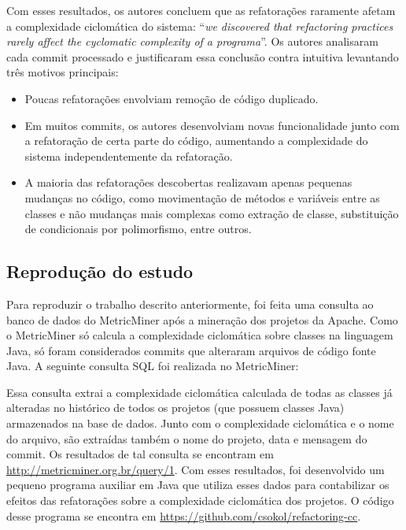 \documentclass[a4paper, 12pt, twoside]{book}
\begin{document}
        Com esses resultados, os autores concluem que as refatorações raramente afetam a complexidade ciclomática do sistema: ``\textit{we discovered that refactoring practices rarely affect the cyclomatic complexity of a programa}''. Os autores analisaram cada commit processado e justificaram essa conclusão contra intuitiva levantando três motivos principais:

        \begin{itemize}
            \item Poucas refatorações envolviam remoção de código duplicado.
            \item Em muitos commits, os autores desenvolviam novas funcionalidade junto com a refatoração de certa parte do código, aumentando a complexidade do sistema independentemente da refatoração.
            \item A maioria das refatorações descobertas realizavam apenas pequenas mudanças no código, como movimentação de métodos e variáveis entre as classes e não mudanças mais complexas como extração de classe, substituição de condicionais por polimorfismo, entre outros.
        \end{itemize}


        \subsection*{Reprodução do estudo}
        Para reproduzir o trabalho descrito anteriormente, foi feita uma consulta ao banco de dados do MetricMiner após a mineração dos projetos da Apache. Como o MetricMiner só calcula a complexidade ciclomática sobre classes na linguagem Java, só foram considerados commits que alteraram arquivos de código fonte Java. A seguinte consulta SQL foi realizada no MetricMiner:

        

        Essa consulta extrai a complexidade ciclomática calculada de todas as classes já alteradas no histórico de todos os projetos (que possuem classes Java) armazenados na base de dados. Junto com o complexidade ciclomática e o nome do arquivo, são extraídas também o nome do projeto, data e mensagem do commit. Os resultados de tal consulta se encontram em \url{http://metricminer.org.br/query/1}. Com esses resultados, foi desenvolvido um pequeno programa auxiliar em Java que utiliza esses dados para contabilizar os efeitos das refatorações sobre a complexidade ciclomática dos projetos. O código desse programa se encontra em \url{https://github.com/csokol/refactoring-cc}.
\end{document}
